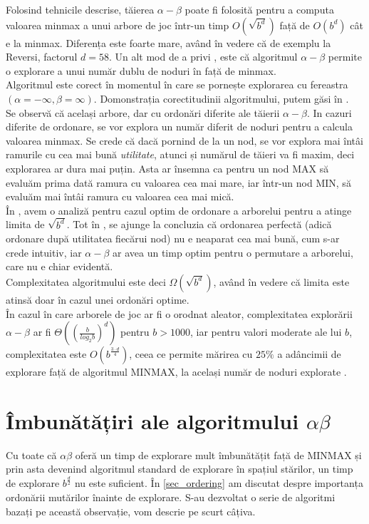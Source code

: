 \documentclass[12pt,twoside,a4paper,fleqn]{book}
\theoremstyle{definition}
\begin{document}
Folosind tehnicile descrise, tăierea $\alpha - \beta$ poate fi folosită pentru a computa valoarea minmax a unui arbore de joc într-un timp $O(\sqrt{b^{d}})$ față de $O(b^{d})$ cât e la minmax. Diferența este foarte mare, având în vedere că de exemplu la Reversi, factorul $d = 58$. Un alt mod de a privi \cite{mcAllester}, este că algoritmul $\alpha - \beta$ permite o explorare a unui număr dublu de noduri în față de minmax.\\
Algoritmul este corect în momentul în care se pornește explorarea cu fereastra $(\alpha = -\infty, \beta = \infty)$. 
Domonstrația corectitudinii algoritmului, putem găsi în \cite{Giumale, mcAllester, sheng_hsu}.\\
Se observă că același arbore, dar cu ordonări diferite ale tăierii $\alpha - \beta$. In cazuri diferite de ordonare, se vor explora un număr diferit de noduri pentru a calcula valoarea minmax. Se crede că dacă pornind de la un nod, se vor explora mai întâi ramurile cu cea mai bună \emph{utilitate}, atunci și numărul de tăieri va fi maxim, deci explorarea ar dura mai puțin. Asta ar însemna ca pentru un nod MAX să evaluăm prima dată ramura cu valoarea cea mai mare, iar într-un nod MIN, să evaluăm mai întâi ramura cu valoarea cea mai mică.\\
În \cite{sheng_hsu}, avem o analiză pentru cazul optim de ordonare a arborelui pentru a atinge limita de $\sqrt{b^{d}}$. Tot în \cite{sheng_hsu}, se ajunge la concluzia că ordonarea perfectă (adică ordonare după utilitatea fiecărui nod) nu e neaparat cea mai bună, cum s-ar crede intuitiv, iar $\alpha - \beta$ ar avea un timp optim pentru o permutare a arborelui, care nu e chiar evidentă.\\
Complexitatea algoritmului este deci $\Omega(\sqrt{b^{d}})$, având în vedere că limita este atinsă doar în cazul unei ordonări optime.\\
În cazul în care arborele de joc ar fi o orodnat aleator, complexitatea explorării $\alpha - \beta$ ar fi 
$\Theta((\frac{b}{log_{2}b})^{d})$ pentru $b > 1000$, iar pentru valori moderate ale lui $b$, complexitatea este $O(b^{\frac{3 \cdot d}{4}})$, ceea ce permite mărirea cu $25\%$ a adâncimii de explorare față de algoritmul MINMAX, la același număr de noduri explorate \cite{Giumale}.
\label{sec_ordering}

\section{Îmbunătățiri ale algoritmului $\alpha \beta$}
Cu toate că $\alpha \beta$ oferă un timp de explorare mult îmbunătățit față de MINMAX și prin asta devenind algoritmul standard de explorare în spațiul stărilor, un timp de explorare $b^{\frac{d}{2}}$ nu este suficient. În \ref{sec_ordering} am discutat despre importanța ordonării mutărilor înainte de explorare. S-au dezvoltat o serie de algoritmi bazați pe această observație, vom descrie pe scurt câțiva.
\end{document}
